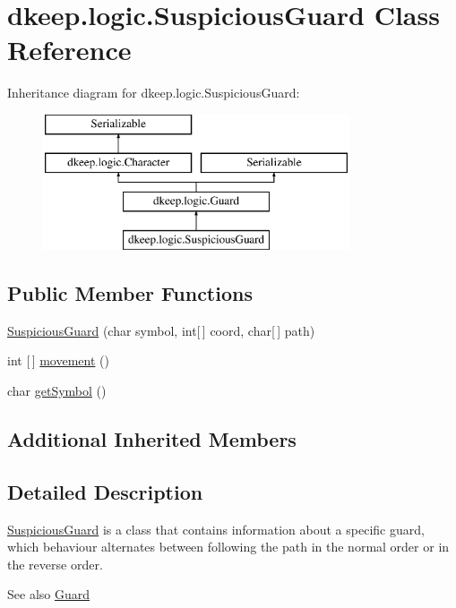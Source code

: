 \hypertarget{classdkeep_1_1logic_1_1_suspicious_guard}{}\section{dkeep.\+logic.\+Suspicious\+Guard Class Reference}
\label{classdkeep_1_1logic_1_1_suspicious_guard}
Inheritance diagram for dkeep.\+logic.\+Suspicious\+Guard\+:\begin{figure}[H]
\begin{center}
\leavevmode
\includegraphics[height=4.000000cm]{classdkeep_1_1logic_1_1_suspicious_guard}
\end{center}
\end{figure}
\subsection*{Public Member Functions}
\begin{DoxyCompactItemize}
\item 
\hyperlink{classdkeep_1_1logic_1_1_suspicious_guard_a457daeb625091df0489c7a35598f6434}{Suspicious\+Guard} (char symbol, int\mbox{[}$\,$\mbox{]} coord, char\mbox{[}$\,$\mbox{]} path)
\item 
int \mbox{[}$\,$\mbox{]} \hyperlink{classdkeep_1_1logic_1_1_suspicious_guard_a10c4b42ec52624f5f4fbc8f38bb4faf1}{movement} ()
\item 
char \hyperlink{classdkeep_1_1logic_1_1_suspicious_guard_a760c8c915013dda755c4d0440071514f}{get\+Symbol} ()
\end{DoxyCompactItemize}
\subsection*{Additional Inherited Members}


\subsection{Detailed Description}
\hyperlink{classdkeep_1_1logic_1_1_suspicious_guard}{Suspicious\+Guard} is a class that contains information about a specific guard, which behaviour alternates between following the path in the normal order or in the reverse order. \begin{DoxySeeAlso}{See also}
\hyperlink{classdkeep_1_1logic_1_1_guard}{Guard} 
\end{DoxySeeAlso}


